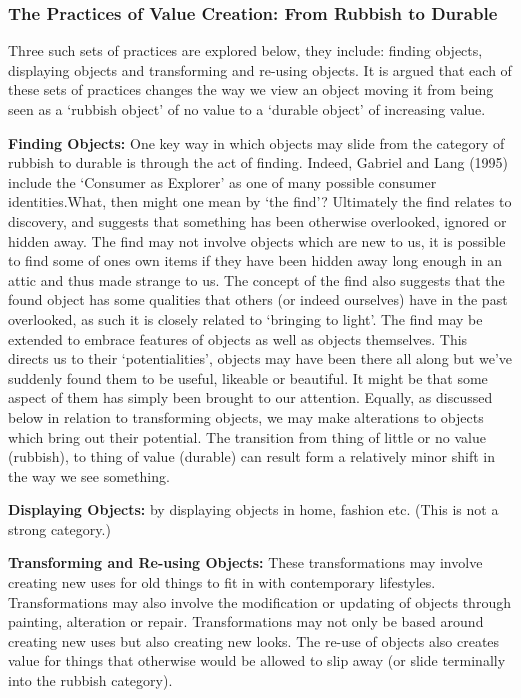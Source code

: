 \documentclass[12pt]{article}
\begin{document}
\subsubsection{The Practices of Value Creation: From Rubbish to Durable}
Three such sets of practices are explored below, they include: finding objects, displaying objects and transforming and re-using objects. It is argued that each of these sets of practices changes the way we view an object moving it from being seen as a ‘rubbish object’ of no value to a ‘durable object’ of increasing value.

\textbf{Finding Objects:} One key way in which objects may slide from the category of rubbish to durable is through the act of finding. Indeed, Gabriel and Lang (1995) include the ‘Consumer as Explorer’ as one of many possible consumer identities.What, then might one mean by ‘the find’? Ultimately the find relates to discovery, and suggests that something has been otherwise overlooked, ignored or hidden away. The find may not involve objects which are new to us, it is possible to find some of ones own items if they have been hidden away long enough in an attic and thus made strange to us. The concept of the find also suggests that the found object has some qualities that others (or indeed ourselves) have in the past overlooked, as such it is closely related to ‘bringing to light’. The find may be extended to embrace features of objects as well as objects themselves. This directs us to their ‘potentialities’, objects may have been there all along but we’ve suddenly found them to be useful, likeable or beautiful. It might be that some aspect of them has simply been brought to our attention. Equally, as discussed below in relation to transforming objects, we may make alterations to objects which bring out their potential. The transition from thing of little or no value (rubbish), to thing of value (durable) can result form a relatively minor shift in the way we see something.

\textbf{Displaying Objects:} by displaying objects in home, fashion etc. (This is not a strong category.)

\textbf{Transforming and Re-using Objects:} These transformations may involve creating new uses for old things to fit in with contemporary lifestyles. Transformations may also involve the modification or updating of objects through painting, alteration or repair. Transformations may not only be based around creating new uses but also creating new looks. The re-use of objects also creates value for things that otherwise would be allowed to slip away (or slide terminally into the rubbish category).
\end{document}
